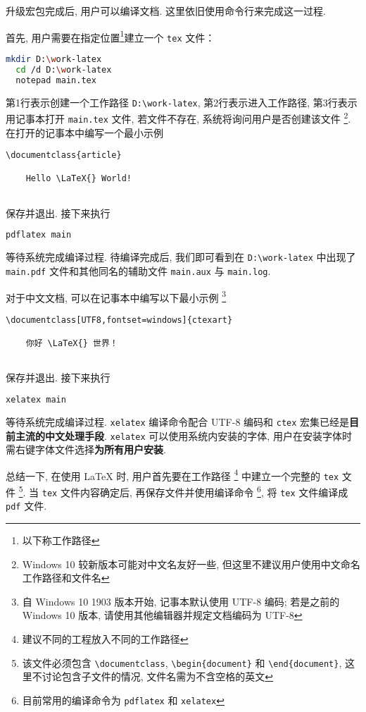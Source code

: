 升级宏包完成后, 用户可以编译文档. 
这里依旧使用命令行来完成这一过程. 

首先, 用户需要在指定位置\footnote{以下称工作路径}建立一个 \texttt{tex} 文件：
\begin{lstlisting}[language = bash]
  mkdir D:\work-latex
  cd /d D:\work-latex
  notepad main.tex
\end{lstlisting}
第1行表示创建一个工作路径 \texttt{D:\textbackslash work-latex},
第2行表示进入工作路径, 第3行表示用记事本打开 \texttt{main.tex} 文件,
若文件不存在, 系统将询问用户是否创建该文件%
\footnote{Windows 10 较新版本可能对中文名友好一些,
但这里不建议用户使用中文命名工作路径和文件名}.
在打开的记事本中编写一个最小示例
\begin{lstlisting}[language={[LaTeX]TeX}]
  \documentclass{article}
  
    Hello \LaTeX{} World!
  
\end{lstlisting}
保存并退出. 
接下来执行
\begin{lstlisting}[language=bash]
  pdflatex main
\end{lstlisting}
等待系统完成编译过程. 
待编译完成后, 我们即可看到在 \texttt{D:\textbackslash work-latex}
中出现了 \texttt{main.pdf} 文件和其他同名的辅助文件
\texttt{main.aux} 与 \texttt{main.log}. 

对于中文文档, 可以在记事本中编写以下最小示例%
\footnote{自 Windows 10 1903 版本开始, 记事本默认使用 UTF-8 编码;
若是之前的 Windows 10 版本, 请使用其他编辑器并规定文档编码为 UTF-8}%
\begin{lstlisting}[language={[LaTeX]TeX}]
  \documentclass[UTF8,fontset=windows]{ctexart}
  
    你好 \LaTeX{} 世界！
  
\end{lstlisting}
保存并退出.
接下来执行
\begin{lstlisting}[language=bash]
  xelatex main
\end{lstlisting}
等待系统完成编译过程.
\texttt{xelatex} 编译命令配合 UTF-8 编码和 \texttt{ctex}
宏集已经是\textbf{目前主流的中文处理手段}.
\texttt{xelatex} 可以使用系统内安装的字体,
用户在安装字体时需右键字体文件选择\textbf{为所有用户安装}.

总结一下, 在使用 \LaTeX{} 时, 用户首先要在工作路径%
\footnote{建议不同的工程放入不同的工作路径}%
中建立一个完整的 \texttt{tex} 文件%
\footnote{该文件必须包含 \texttt{\textbackslash documentclass},
\texttt{\textbackslash begin\{document\}} 和
\texttt{\textbackslash end\{document\}},
这里不讨论包含子文件的情况,
文件名需为不含空格的英文}.
当 \texttt{tex} 文件内容确定后, 再保存文件并使用编译命令%
\footnote{目前常用的编译命令为 \texttt{pdflatex} 和 \texttt{xelatex}},
将 \texttt{tex} 文件编译成 \texttt{pdf} 文件. 

